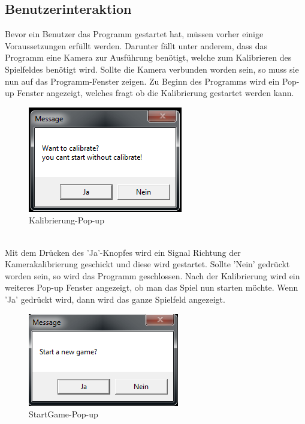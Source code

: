 \subsection{Benutzerinteraktion}
Bevor ein Benutzer das Programm gestartet hat, müssen vorher einige Voraussetzungen erfüllt werden. Darunter fällt unter anderem, dass das Programm eine Kamera zur Ausführung benötigt, welche zum Kalibrieren des Spielfeldes benötigt wird. Sollte die Kamera verbunden worden sein, so muss sie nun auf das Programm-Fenster zeigen. Zu Beginn des Programms wird ein Pop-up Fenster angezeigt, welches fragt ob die Kalibrierung gestartet werden kann.
 \begin{figure}[h]
	\centering
	\caption{Kalibrierung-Pop-up}
	\includegraphics[width=\textwidth/3]{bilder/Calibrate-Popup.png}
\end{figure}\\
Mit dem Drücken des 'Ja'-Knopfes wird ein Signal Richtung der Kamerakalibrierung geschickt und diese wird gestartet. Sollte 'Nein' gedrückt worden sein, so wird das Programm geschlossen.
Nach der Kalibrierung wird ein weiteres Pop-up Fenster angezeigt, ob man das Spiel nun starten möchte. Wenn 'Ja' gedrückt wird, dann wird das ganze Spielfeld angezeigt. 
 \begin{figure}[h]
	\centering
	\caption{StartGame-Pop-up}
	\includegraphics[width=\textwidth/3]{bilder/startGame-Popup.png}
\end{figure}\\
